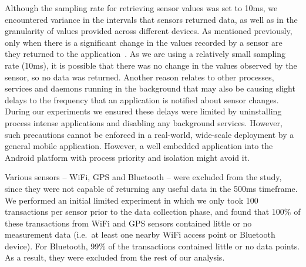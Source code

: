 \documentclass{article}
\begin{document}
Although the sampling rate for retrieving sensor values was set to 10ms, we encountered variance in the intervals that sensors returned data, as well as in the granularity of values provided across different devices.
		As mentioned previously, only when there is a significant change in the values recorded by a sensor are they returned to the application~\cite{AndroidAPIRef}.	As we are using a relatively small sampling rate (10ms), it is possible that there was no change in the values observed by the sensor, so no data was returned.
		Another reason relates to other processes, services and daemons running in the background that may also be causing slight delays to the frequency that an application is notified about sensor changes.
		During our experiments we ensured these delays were limited by uninstalling process intense applications and disabling any background services.  However, such precautions cannot be enforced in a real-world, wide-scale deployment by a general mobile application. However, a well embedded application into the Android platform with process priority and isolation might avoid it. 

Various sensors -- WiFi, GPS and Bluetooth -- were excluded from the study, since they were not capable of returning any useful data in the 500ms timeframe.
		We performed an initial limited experiment in which we only took 100 transactions per sensor prior to the data collection phase, and found that 100\% of these transactions from WiFi and GPS sensors contained little or no measurement data (i.e.\ at least one nearby WiFi access point or Bluetooth device). For Bluetooth, 99\% of the transactions contained little or no data points. As a result, they were excluded from the rest of our analysis.

\begin{table}[h]
	\centering
	\caption{Time Required for Receiving Results from Sensors}
	\label{tab:wifibt}
\end{table}
\end{document}
